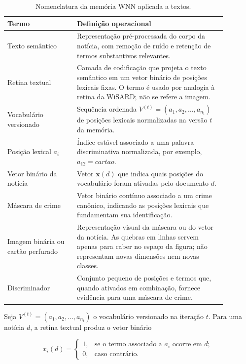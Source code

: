 \begin{table}[ht]
\centering
\caption{Nomenclatura da memória WNN aplicada a textos.}
\label{tab:nomenclatura-wnn}
\begin{tabular}{p{0.28\linewidth}p{0.60\linewidth}}
\hline
\textbf{Termo} & \textbf{Definição operacional} \\
\hline
Texto semântico & Representação pré-processada do corpo da notícia, com remoção de ruído e retenção de termos substantivos relevantes. \\
Retina textual & Camada de codificação que projeta o texto semântico em um vetor binário de posições lexicais fixas. O termo é usado por analogia à retina da WiSARD; não se refere a imagem. \\
Vocabulário versionado & Sequência ordenada $V^{(t)}=(a_1,a_2,\ldots,a_{n_t})$ de posições lexicais normalizadas na versão $t$ da memória. \\
Posição lexical $a_i$ & Índice estável associado a uma palavra discriminativa normalizada, por exemplo, $a_{12}=\textit{cartao}$. \\
Vetor binário da notícia & Vetor $\mathbf{x}(d)$ que indica quais posições do vocabulário foram ativadas pelo documento $d$. \\
Máscara de crime & Vetor binário contínuo associado a um crime canônico, indicando as posições lexicais que fundamentam sua identificação. \\
Imagem binária ou cartão perfurado & Representação visual da máscara ou do vetor da notícia. As quebras em linhas servem apenas para caber no espaço da figura; não representam novas dimensões nem novas classes. \\
Discriminador & Conjunto pequeno de posições e termos que, quando ativados em combinação, fornece evidência para uma máscara de crime. \\
\hline
\end{tabular}
\end{table}

Seja $V^{(t)}=(a_1,a_2,\ldots,a_{n_t})$ o vocabulário versionado na iteração $t$. Para uma notícia $d$, a retina textual produz o vetor binário

\begin{equation}
x_i(d)=
\begin{cases}
1, & \text{se o termo associado a } a_i \text{ ocorre em } d;\\
0, & \text{caso contrário.}
\end{cases}
\end{equation}

